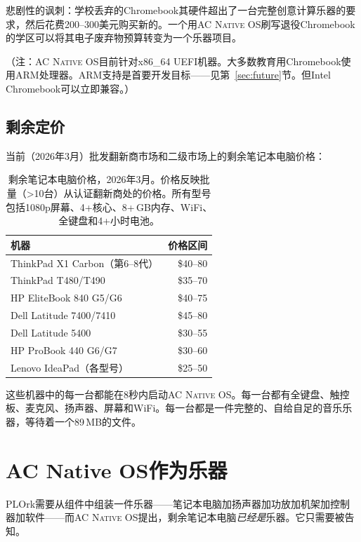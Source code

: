 \documentclass[10pt,letterpaper,twocolumn]{article}
\newcommand{\acos}{\textsc{AC Native OS}}
\begin{document}
悲剧性的讽刺：学校丢弃的Chromebook其硬件超出了一台完整创意计算乐器的要求，然后花费200--300美元购买新的。一个用\acos{}刷写退役Chromebook的学区可以将其电子废弃物预算转变为一个乐器项目。

（注：\acos{}目前针对x86\_64 UEFI机器。大多数教育用Chromebook使用ARM处理器。ARM支持是首要开发目标——见第~\ref{sec:future}节。但Intel Chromebook可以立即兼容。）

\subsection{剩余定价}

当前（2026年3月）批发翻新商市场和二级市场上的剩余笔记本电脑价格：

\begin{table}[h]
\small
\centering
\begin{tabular}{lr}
\toprule
\textbf{机器} & \textbf{价格区间} \\
\midrule
ThinkPad X1 Carbon（第6--8代） & \$40--80 \\
ThinkPad T480/T490 & \$35--70 \\
HP EliteBook 840 G5/G6 & \$40--75 \\
Dell Latitude 7400/7410 & \$45--80 \\
Dell Latitude 5400 & \$30--55 \\
HP ProBook 440 G6/G7 & \$30--60 \\
Lenovo IdeaPad（各型号） & \$25--50 \\
\bottomrule
\end{tabular}
\caption{剩余笔记本电脑价格，2026年3月。价格反映批量（\textgreater 10台）从认证翻新商处的价格。所有型号包括1080p屏幕、4+核心、8+\,GB内存、WiFi、全键盘和4+小时电池。}
\label{tab:surplus}
\end{table}

这些机器中的每一台都能在8秒内启动\acos{}。每一台都有全键盘、触控板、麦克风、扬声器、屏幕和WiFi。每一台都是一件完整的、自给自足的音乐乐器，等待着一个89\,MB的文件。


\section{AC Native OS作为乐器}
\label{sec:instrument}

PLOrk需要从组件中组装一件乐器——笔记本电脑加扬声器加功放加机架加控制器加软件——而\acos{}提出，剩余笔记本电脑\emph{已经是}乐器。它只需要被告知。
\end{document}
